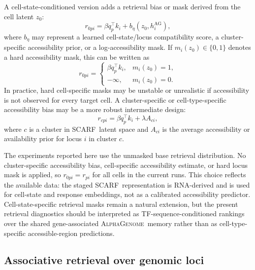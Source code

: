\documentclass[11pt]{article}
\newcommand{\ag}{\textsc{AlphaGenome}}
\newcommand{\scarf}{\textsc{SCARF}}
\begin{document}
A cell-state-conditioned version adds a retrieval bias or mask derived from the cell latent \(z_0\):
\begin{equation}
    r_{0pi} = \beta q_p^\top k_i + b_\eta(z_0, h_i^{\mathrm{AG}}),
\end{equation}
where \(b_\eta\) may represent a learned cell-state/locus compatibility score, a cluster-specific accessibility prior, or a log-accessibility mask. If \(m_i(z_0) \in \{0,1\}\) denotes a hard accessibility mask, this can be written as
\begin{equation}
    r_{0pi} = \begin{cases}
        \beta q_p^\top k_i, & m_i(z_0)=1,\\
        -\infty, & m_i(z_0)=0.
    \end{cases}
\end{equation}
In practice, hard cell-specific masks may be unstable or unrealistic if accessibility is not observed for every target cell. A cluster-specific or cell-type-specific accessibility bias may be a more robust intermediate design:
\begin{equation}
    r_{cpi} = \beta q_p^\top k_i + \lambda A_{ci},
\end{equation}
where \(c\) is a cluster in \scarf\ latent space and \(A_{ci}\) is the average accessibility or availability prior for locus \(i\) in cluster \(c\).

The experiments reported here use the unmasked base retrieval distribution. No cluster-specific accessibility bias, cell-specific accessibility estimate, or hard locus mask is applied, so \(r_{0pi}=r_{pi}\) for all cells in the current runs. This choice reflects the available data: the staged \scarf\ representation is RNA-derived and is used for cell-state and response embeddings, not as a calibrated accessibility predictor. Cell-state-specific retrieval masks remain a natural extension, but the present retrieval diagnostics should be interpreted as TF-sequence-conditioned rankings over the shared gene-associated \ag\ memory rather than as cell-type-specific accessible-region predictions.

\subsection{Associative retrieval over genomic loci}
\end{document}
